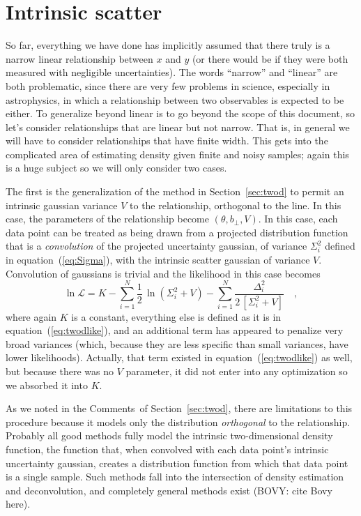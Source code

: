 \documentclass[12pt]{article}
\newcommand{\sectionname}{Section}
\newcommand{\equationname}{equation}
\newcommand{\commentsname}{Comments}
\newcounter{problem}
\newcommand{\like}{\mathscr{L}}
\newcommand{\bperp}{b_{\perp}}
\begin{document}
\section{Intrinsic scatter}\label{sec:scatter}

So far, everything we have done has implicitly assumed that there
truly is a narrow linear relationship between $x$ and $y$ (or there
would be if they were both measured with negligible uncertainties).
The words ``narrow'' and ``linear'' are both problematic, since there
are very few problems in science, especially in astrophysics, in which
a relationship between two observables is expected to be either.  To
generalize beyond linear is to go beyond the scope of this document,
so let's consider relationships that are linear but not narrow.  That
is, in general we will have to consider relationships that have finite
width.  This gets into the complicated area of estimating density
given finite and noisy samples; again this is a huge subject so we
will only consider two cases.

The first is the generalization of the method in
\sectionname~\ref{sec:twod} to permit an intrinsic gaussian variance
$V$ to the relationship, orthogonal to the line.  In this case, the
parameters of the relationship become $(\theta,\bperp,V)$.  In this
case, each data point can be treated as being drawn from a projected
distribution function that is a \emph{convolution} of the projected
uncertainty gaussian, of variance $\Sigma_i^2$ defined in
\equationname~(\ref{eq:Sigma}), with the intrinsic scatter gaussian of
variance $V$.  Convolution of gaussians is trivial and the likelihood
in this case becomes
\begin{equation}
\ln\like = K - \sum_{i=1}^N \frac{1}{2}\,\ln(\Sigma_{i}^2+V)
 - \sum_{i=1}^N \frac{\Delta_i^2}{2\,[\Sigma_{i}^2+V]} \quad ,
\end{equation}
where again $K$ is a constant, everything else is defined as it is in
\equationname~(\ref{eq:twodlike}), and an additional term has
appeared to penalize very broad variances (which, because they are
less specific than small variances, have lower likelihoods).
Actually, that term existed in \equationname~(\ref{eq:twodlike}) as
well, but because there was no $V$ parameter, it did not enter into
any optimization so we absorbed it into $K$.

As we noted in the \commentsname\ of \sectionname~\ref{sec:twod},
there are limitations to this procedure because it models only the
distribution \emph{orthogonal} to the relationship.  Probably all good
methods fully model the intrinsic two-dimensional density function,
the function that, when convolved with each data point's intrinsic
uncertainty gaussian, creates a distribution function from which that
data point is a single sample.  Such methods fall into the
intersection of density estimation and deconvolution, and completely
general methods exist (BOVY: cite Bovy here).
\end{document}
